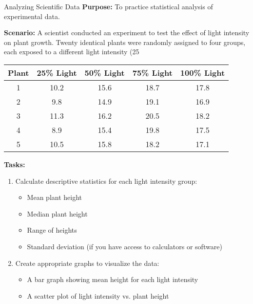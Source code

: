 \begin{investigation}{Analyzing Scientific Data}
\textbf{Purpose:} To practice statistical analysis of experimental data.

\textbf{Scenario:} A scientist conducted an experiment to test the effect of light intensity on plant growth. Twenty identical plants were randomly assigned to four groups, each exposed to a different light intensity (25%

\begin{center}
\begin{tabular}{|c|c|c|c|c|}
\hline
\textbf{Plant} & \textbf{25\% Light} & \textbf{50\% Light} & \textbf{75\% Light} & \textbf{100\% Light} \\
\hline
1 & 10.2 & 15.6 & 18.7 & 17.8 \\
\hline
2 & 9.8 & 14.9 & 19.1 & 16.9 \\
\hline
3 & 11.3 & 16.2 & 20.5 & 18.2 \\
\hline
4 & 8.9 & 15.4 & 19.8 & 17.5 \\
\hline
5 & 10.5 & 15.8 & 18.2 & 17.1 \\
\hline
\end{tabular}
\end{center}

\textbf{Tasks:}
\begin{enumerate}
    \item Calculate descriptive statistics for each light intensity group:
    \begin{itemize}
        \item Mean plant height
        \item Median plant height
        \item Range of heights
        \item Standard deviation (if you have access to calculators or software)
    \end{itemize}
    
    \item Create appropriate graphs to visualize the data:
    \begin{itemize}
        \item A bar graph showing mean height for each light intensity
        \item A scatter plot of light intensity vs. plant height
    \end{itemize}
    

\end{enumerate}
\end{investigation}
